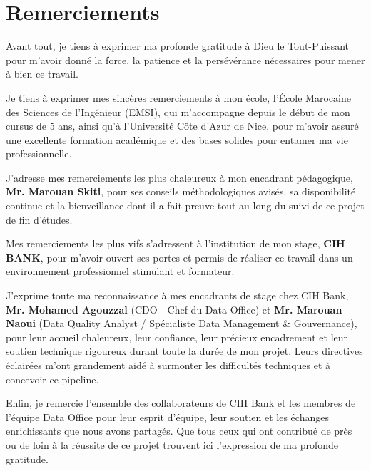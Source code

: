 \chapter*{Remerciements}

\vspace*{1cm}

Avant tout, je tiens à exprimer ma profonde gratitude à Dieu le Tout-Puissant pour m'avoir donné la force, la patience et la persévérance nécessaires pour mener à bien ce travail.

\vspace{0.5cm}

Je tiens à exprimer mes sincères remerciements à mon école, l'École Marocaine des Sciences de l'Ingénieur (EMSI), qui m'accompagne depuis le début de mon cursus de 5 ans, ainsi qu'à l'Université Côte d'Azur de Nice, pour m'avoir assuré une excellente formation académique et des bases solides pour entamer ma vie professionnelle.

\vspace{0.5cm}

J'adresse mes remerciements les plus chaleureux à mon encadrant pédagogique, \textbf{Mr. Marouan Skiti}, pour ses conseils méthodologiques avisés, sa disponibilité continue et la bienveillance dont il a fait preuve tout au long du suivi de ce projet de fin d'études.

\vspace{0.5cm}

Mes remerciements les plus vifs s'adressent à l'institution de mon stage, \textbf{CIH BANK}, pour m'avoir ouvert ses portes et permis de réaliser ce travail dans un environnement professionnel stimulant et formateur.

\vspace{0.5cm}

J'exprime toute ma reconnaissance à mes encadrants de stage chez CIH Bank, \textbf{Mr. Mohamed Agouzzal} (CDO - Chef du Data Office) et \textbf{Mr. Marouan Naoui} (Data Quality Analyst / Spécialiste Data Management \& Gouvernance), pour leur accueil chaleureux, leur confiance, leur précieux encadrement et leur soutien technique rigoureux durant toute la durée de mon projet. Leurs directives éclairées m'ont grandement aidé à surmonter les difficultés techniques et à concevoir ce pipeline.

\vspace{0.5cm}

Enfin, je remercie l'ensemble des collaborateurs de CIH Bank et les membres de l'équipe Data Office pour leur esprit d'équipe, leur soutien et les échanges enrichissants que nous avons partagés. Que tous ceux qui ont contribué de près ou de loin à la réussite de ce projet trouvent ici l'expression de ma profonde gratitude.
